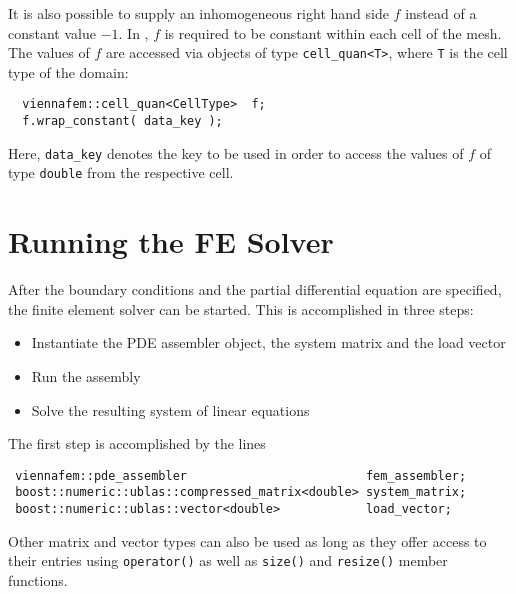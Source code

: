 It is also possible to supply an inhomogeneous right hand side $f$ instead of a constant value $-1$.
In {\ViennaMathversion}, $f$ is required to be constant within each cell of the mesh.
The values of $f$ are accessed via objects of type \lstinline|cell_quan<T>|, where \lstinline|T| is the cell type of the {\ViennaGrid}
domain:
\begin{lstlisting}
  viennafem::cell_quan<CellType>  f;
  f.wrap_constant( data_key );  
\end{lstlisting}
Here, \lstinline|data_key| denotes the key to be used in order to access the values of $f$ of type \lstinline|double| from the respective cell.


\section{Running the FE Solver}
After the boundary conditions and the partial differential equation are specified, the finite element solver can be started.
This is accomplished in three steps:
\begin{itemize}
 \item Instantiate the PDE assembler object, the system matrix and the load vector
 \item Run the assembly
 \item Solve the resulting system of linear equations
\end{itemize}

The first step is accomplished by the lines
\begin{lstlisting}
 viennafem::pde_assembler                         fem_assembler;
 boost::numeric::ublas::compressed_matrix<double> system_matrix;
 boost::numeric::ublas::vector<double>            load_vector;
\end{lstlisting}
Other matrix and vector types can also be used as long as they offer access to their entries using \lstinline|operator()| as well as \lstinline|size()| and \lstinline|resize()| member functions.

